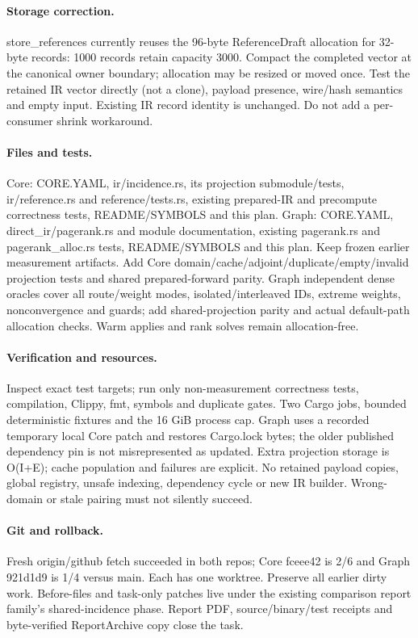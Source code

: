 \documentclass[11pt]{article}
\begin{document}
\paragraph{Storage correction.} store\_references currently reuses the 96-byte
ReferenceDraft allocation for 32-byte records: 1000 records retain capacity 3000.
Compact the completed vector at the canonical owner boundary; allocation may be
resized or moved once. Test the retained IR vector directly (not a clone), payload
presence, wire/hash semantics and empty input. Existing IR record identity is
unchanged. Do not add a per-consumer shrink workaround.
\paragraph{Files and tests.} Core: CORE.YAML, ir/incidence.rs, its projection
submodule/tests, ir/reference.rs and reference/tests.rs, existing prepared-IR
and precompute correctness tests, README/SYMBOLS and this plan. Graph: CORE.YAML,
direct\_ir/pagerank.rs and module documentation, existing pagerank.rs and
pagerank\_alloc.rs tests, README/SYMBOLS and this plan. Keep frozen earlier
measurement artifacts. Add Core domain/cache/adjoint/duplicate/empty/invalid
projection tests and shared prepared-forward parity. Graph independent dense
oracles cover all route/weight modes, isolated/interleaved IDs, extreme weights,
nonconvergence and guards; add shared-projection parity and actual default-path
allocation checks. Warm applies and rank solves remain allocation-free.
\paragraph{Verification and resources.} Inspect exact test targets; run only
non-measurement correctness tests, compilation, Clippy, fmt, symbols and duplicate
gates. Two Cargo jobs, bounded deterministic fixtures and the 16 GiB process cap.
Graph uses a recorded temporary local Core patch and restores Cargo.lock bytes;
the older published dependency pin is not misrepresented as updated. Extra
projection storage is O(I+E); cache population and failures are explicit. No
retained payload copies, global registry, unsafe indexing, dependency cycle or
new IR builder. Wrong-domain or stale pairing must not silently succeed.
\paragraph{Git and rollback.} Fresh origin/github fetch succeeded in both repos;
Core fceee42 is 2/6 and Graph 921d1d9 is 1/4 versus main. Each has one worktree.
Preserve all earlier dirty work. Before-files and task-only patches live under
the existing comparison report family's shared-incidence phase. Report PDF,
source/binary/test receipts and byte-verified ReportArchive copy close the task.
\end{document}
